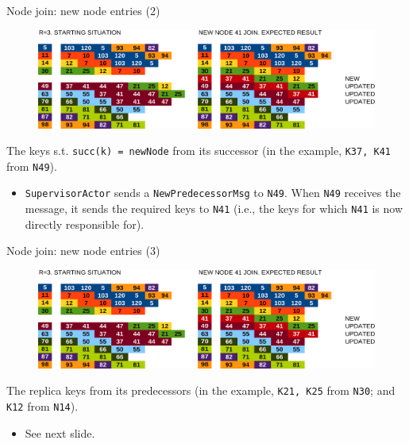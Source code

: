 \documentclass{beamer}
\begin{document}
\begin{frame}{Node join: new node entries (2)} \justify

    \begin{figure}
        \includegraphics[width=\linewidth]{01-NodeJoin.png}
    \end{figure}

    The keys s.t. \texttt{succ(k) = newNode} from its successor (in the example, \texttt{K37, K41} from \texttt{N49}).
        
    \begin{itemize}[label=$\bullet$]
        \item \texttt{SupervisorActor} sends a \texttt{NewPredecessorMsg} to \texttt{N49}. When \texttt{N49} receives the message, it sends the required keys to \texttt{N41} (i.e., the keys for which \texttt{N41} is now directly responsible for).
    \end{itemize}

\end{frame}

\begin{frame}{Node join: new node entries (3)} \justify

    \begin{figure}
        \includegraphics[width=\linewidth]{01-NodeJoin.png}
    \end{figure}

    \item The replica keys from its predecessors (in the example, \texttt{K21, K25} from \texttt{N30}; and \texttt{K12} from \texttt{N14}).

    \begin{itemize}[label=$\bullet$]
        \item See next slide.
    \end{itemize}

\end{frame}
\end{document}
